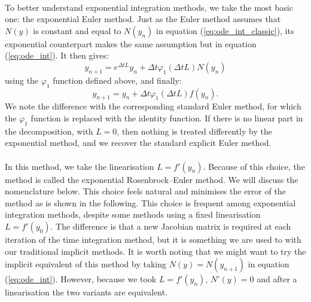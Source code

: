       \paragraph{}
      To better understand exponential integration methods, we take the most basic one: the exponential Euler method.
      Just as the Euler method assumes that $N\left(y\right)$ is constant and equal to $N\left(y_n\right)$ in equation (\ref{eq:ode_int_classic}), its exponential counterpart makes the same assumption but in equation (\ref{eq:ode_int}).
      It then gives:
      \begin{equation}
        y_{n+1} = e^{\Delta t L} y_n + \Delta t \varphi_1\left(\Delta t L\right) N\left(y_n\right)
      \end{equation}
      using the $\varphi_1$ function defined above, and finally:
      \begin{equation}\label{eq:expeuler}
        y_{n+1} = y_n + \Delta t \varphi_1\left(\Delta t L\right) f\left(y_n\right) .
      \end{equation}
      We note the difference with the corresponding standard Euler method, for which the $\varphi_1$ function is replaced with the identity function.
      If there is no linear part in the decomposition, with $L = 0$, then nothing is treated differently by the exponential method, and we recover the standard explicit Euler method.

      \paragraph{}
      In this method, we take the linearisation $L = f'\left(y_n\right)$.
      Because of this choice, the method is called the exponential Rosenbrock--Euler method.
      We will discuss the nomenclature below.
      This choice feels natural and minimises the error of the method as is shown in the following.
      This choice is frequent among exponential integration methods, despite some methods using a fixed linearisation $L = f'\left(y_0\right)$.
      The difference is that a new Jacobian matrix is required at each iteration of the time integration method, but it is something we are used to with our traditional implicit methods.
      It is worth noting that we might want to try the implicit equivalent of this method by taking $N\left(y\right) = N\left(y_{n+1}\right)$ in equation (\ref{eq:ode_int}).
      However, because we took $L = f'\left(y_n\right)$, $N'\left(y\right) = 0$ and after a linearisation the two variants are equivalent.


